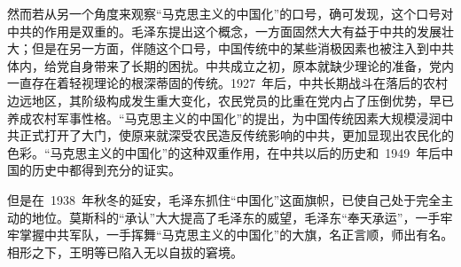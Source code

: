 然而若从另一个角度来观察“马克思主义的中国化”的口号，确可发现，这个口号对中共的作用是双重的。毛泽东提出这个概念，一方面固然大大有益于中共的发展壮大；但是在另一方面，伴随这个口号，中国传统中的某些消极因素也被注入到中共体内，给党自身带来了长期的困扰。中共成立之初，原本就缺少理论的准备，党内一直存在着轻视理论的根深蒂固的传统。1927~年后，中共长期战斗在落后的农村边远地区，其阶级构成发生重大变化，农民党员的比重在党内占了压倒优势，早已养成农村军事性格。“马克思主义的中国化”的提出，为中国传统因素大规模浸润中共正式打开了大门，使原来就深受农民造反传统影响的中共，更加显现出农民化的色彩。“马克思主义的中国化”的这种双重作用，在中共以后的历史和~1949~年后中国的历史中都得到充分的证实。

但是在~1938~年秋冬的延安，毛泽东抓住“中国化”这面旗帜，已使自己处于完全主动的地位。莫斯科的“承认”大大提高了毛泽东的威望，毛泽东“奉天承运”，一手牢牢掌握中共军队，一手挥舞“马克思主义的中国化”的大旗，名正言顺，师出有名。相形之下，王明等已陷入无以自拔的窘境。